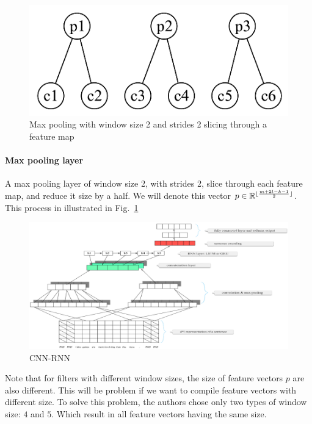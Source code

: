 \begin{figure}[H]
	\centering	\includegraphics[scale=0.4]{figure/2-max}
	\caption{Max pooling with window size 2 and strides 2 slicing through a feature map}
	\label{fig:2-max-pooling}
\end{figure}
  
\paragraph{Max pooling layer} A max pooling layer of window size 2, with strides 2, slice through each feature map, and reduce it size by a half.
We will denote this vector \(p \in \mathbb{R}^{\lfloor \frac{m + 2l - k - 1}{2} \rfloor} \). 
This process in illustrated in Fig.~\ref{fig:2-max-pooling}   


\begin{figure}[H]
	\centering	\includegraphics[scale=0.34]{figure/cnn-rnn}
	\caption{CNN-RNN}
	\label{fig:cnn-rnn}
\end{figure}

Note that for filters with different window sizes, the size of feature vectors \(p\) are also different. 
This will be problem if we want to compile feature vectors with different size.
To solve this problem, the authors chose only two types of window size: \(4\) and \(5\).
Which result in all feature vectors having the same size. 

